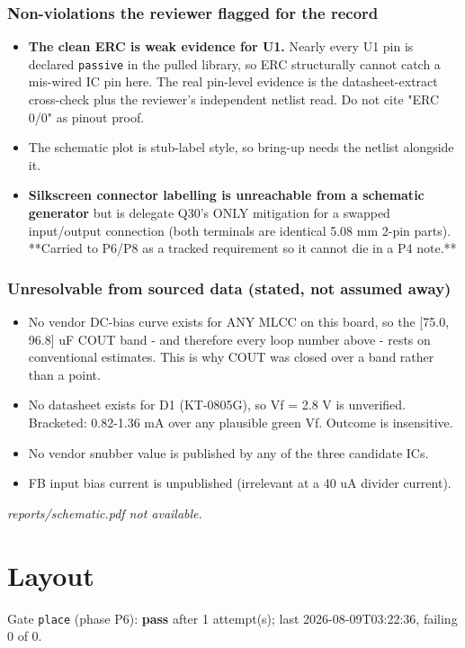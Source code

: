 \documentclass[11pt,a4paper]{article}
\begin{document}
\subsubsection*{Non-violations the reviewer flagged for the record}
\begin{itemize}
\item \textbf{The clean ERC is weak evidence for U1.} Nearly every U1 pin is declared
\texttt{passive} in the pulled library, so ERC structurally cannot catch a mis-wired IC
pin here. The real pin-level evidence is the datasheet-extract cross-check plus
the reviewer's independent netlist read. Do not cite "ERC 0/0" as pinout proof.
\item The schematic plot is stub-label style, so bring-up needs the netlist alongside it.
\item \textbf{Silkscreen connector labelling is unreachable from a schematic generator} but is
delegate Q30's ONLY mitigation for a swapped input/output connection (both
terminals are identical 5.08 mm 2-pin parts). {*}{*}Carried to P6/P8 as a tracked
requirement so it cannot die in a P4 note.{*}{*}
\end{itemize}
\subsubsection*{Unresolvable from sourced data (stated, not assumed away)}
\begin{itemize}
\item No vendor DC-bias curve exists for ANY MLCC on this board, so the {[}75.0, 96.8{]} uF
COUT band - and therefore every loop number above - rests on conventional
estimates. This is why COUT was closed over a band rather than a point.
\item No datasheet exists for D1 (KT-0805G), so Vf = 2.8 V is unverified. Bracketed:
0.82-1.36 mA over any plausible green Vf. Outcome is insensitive.
\item No vendor snubber value is published by any of the three candidate ICs.
\item FB input bias current is unpublished (irrelevant at a 40 uA divider current).
\end{itemize}
\emph{reports/schematic.pdf not available.}
\section{Layout}
Gate \texttt{place} (phase P6): \textbf{pass} after 1 attempt(s); last 2026-08-09T03:22:36, failing 0 of 0.
\end{document}
